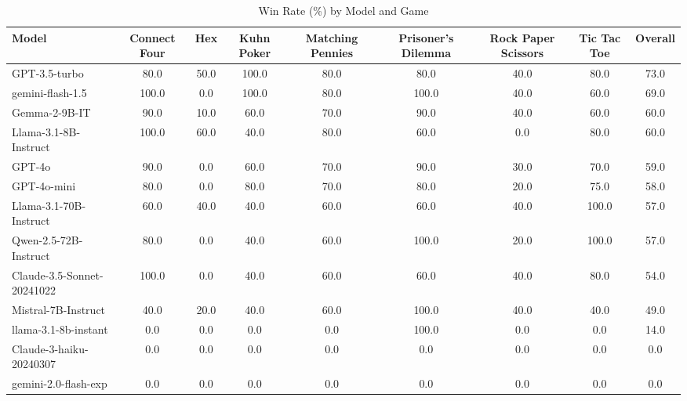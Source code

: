 \begin{table}[htbp]
\centering
\caption{Win Rate (\%) by Model and Game}
\begin{tabular}{lcccccccc}
\toprule
Model & Connect Four & Hex & Kuhn Poker & Matching Pennies & Prisoner's Dilemma & Rock Paper Scissors & Tic Tac Toe & Overall \\
\midrule
GPT-3.5-turbo & 80.0 & 50.0 & 100.0 & 80.0 & 80.0 & 40.0 & 80.0 & 73.0 \\
gemini-flash-1.5 & 100.0 & 0.0 & 100.0 & 80.0 & 100.0 & 40.0 & 60.0 & 69.0 \\
Gemma-2-9B-IT & 90.0 & 10.0 & 60.0 & 70.0 & 90.0 & 40.0 & 60.0 & 60.0 \\
Llama-3.1-8B-Instruct & 100.0 & 60.0 & 40.0 & 80.0 & 60.0 & 0.0 & 80.0 & 60.0 \\
GPT-4o & 90.0 & 0.0 & 60.0 & 70.0 & 90.0 & 30.0 & 70.0 & 59.0 \\
GPT-4o-mini & 80.0 & 0.0 & 80.0 & 70.0 & 80.0 & 20.0 & 75.0 & 58.0 \\
Llama-3.1-70B-Instruct & 60.0 & 40.0 & 40.0 & 60.0 & 60.0 & 40.0 & 100.0 & 57.0 \\
Qwen-2.5-72B-Instruct & 80.0 & 0.0 & 40.0 & 60.0 & 100.0 & 20.0 & 100.0 & 57.0 \\
Claude-3.5-Sonnet-20241022 & 100.0 & 0.0 & 40.0 & 60.0 & 60.0 & 40.0 & 80.0 & 54.0 \\
Mistral-7B-Instruct & 40.0 & 20.0 & 40.0 & 60.0 & 100.0 & 40.0 & 40.0 & 49.0 \\
llama-3.1-8b-instant & 0.0 & 0.0 & 0.0 & 0.0 & 100.0 & 0.0 & 0.0 & 14.0 \\
Claude-3-haiku-20240307 & 0.0 & 0.0 & 0.0 & 0.0 & 0.0 & 0.0 & 0.0 & 0.0 \\
gemini-2.0-flash-exp & 0.0 & 0.0 & 0.0 & 0.0 & 0.0 & 0.0 & 0.0 & 0.0 \\
\bottomrule
\end{tabular}
\end{table}
